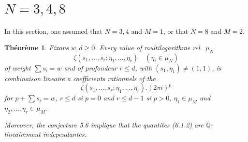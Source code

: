 \documentclass[11pt,a4paper]{article}
\theoremstyle{plain}
\newtheorem{theorem}{Th\'eor\`eme}[section]
\theoremstyle{definition}
\newcommand{\Q}{\mathbb{Q}}
\begin{document}
\section{$N=3,4,8$}
\label{sec:6}

In this section, one assumed that $N=3,4$ and $M=1$, or that $N=8$ and $M=2$.

\begin{theorem}\label{thm:6.1}
Fixons $w, d \geq 0$. Every value of multilogarithme rel.~$\mu_N$
\begin{equation}\label{eq:6.1.1}
\zeta(s_1,\ldots,s_r; \eta_1,\ldots, \eta_r) \quad (\eta_i \in \mu_N)
\end{equation}
of weight $\sum s_i = w$ and of profondeur $r \leq d$, with $(s_1, \eta_1) \neq (1,1)$, is combinaison lineaire a coefficients rationnels of the
\begin{equation}\label{eq:6.1.2}
\zeta(s_1,\ldots,s_r; \eta_1,\ldots, \eta_r).(2\pi i)^p
\end{equation}
for $p + \sum s_i = w$, $r \leq d$ si $p=0$ and $r \leq d-1$ si $p > 0$, $\eta_1 \in \mu_M$ and $\eta_2,\ldots,\eta_r \in \mu_M$.

Moreover, the conjecture 5.6 implique that the quantites (6.1.2) are $\Q$-lineairement independantes.
\end{theorem}
\end{document}
